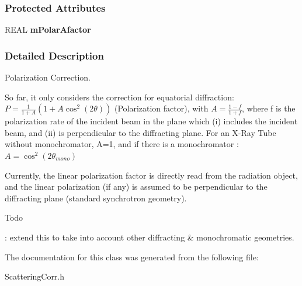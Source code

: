 \subsubsection*{Protected Attributes}
\begin{DoxyCompactItemize}
\item 
R\-E\-A\-L {\bfseries m\-Polar\-Afactor}\label{a00068_a8a0115cf6d539ede891056f94b6887cf}

\end{DoxyCompactItemize}


\subsubsection{Detailed Description}
Polarization Correction. 

So far, it only considers the correction for equatorial diffraction\-: $ P = \frac{1}{1+A}\left(1+A\cos^2(2\theta)\right) $ (Polarization factor), with $ A = \frac{1-f}{1+f} $, where f is the polarization rate of the incident beam in the plane which (i) includes the incident beam, and (ii) is perpendicular to the diffracting plane. For an X-\/\-Ray Tube without monochromator, A=1, and if there is a monochromator \-: $ A = \cos^2(2\theta_{mono}) $

Currently, the linear polarization factor is directly read from the radiation object, and the linear polarization (if any) is assumed to be perpendicular to the diffracting plane (standard synchrotron geometry).

\begin{DoxyRefDesc}{Todo}
\item[{\bf Todo}]\-: extend this to take into account other diffracting \& monochromatic geometries. \end{DoxyRefDesc}


The documentation for this class was generated from the following file\-:\begin{DoxyCompactItemize}
\item 
Scattering\-Corr.\-h\end{DoxyCompactItemize}
